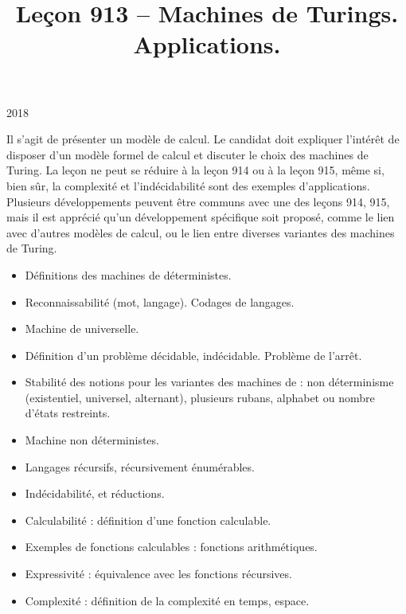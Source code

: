\documentclass{agregfiche}
\title{Leçon 913 -- Machines de Turings. Applications.}
\begin{document}
\maketitle

\secrapports

\begin{rapport}{2018}

Il s'agit de présenter un modèle de calcul.
Le candidat doit expliquer l'intérêt de disposer d'un modèle formel de calcul et discuter le choix des machines de Turing.
La leçon ne peut se réduire à la leçon 914 ou à la leçon 915, même si, bien sûr, la complexité et l'indécidabilité sont des exemples d'applications.
Plusieurs développements peuvent être communs avec une des leçons 914, 915, mais il est apprécié qu'un développement spécifique soit proposé, comme le lien avec d'autres modèles de calcul, ou le lien entre diverses variantes des machines de Turing.

\end{rapport}

\secindispensables

\begin{itemize}
    \item Définitions des machines de  déterministes.
    \item Reconnaissabilité (mot, langage). Codages de langages. %
    \item Machine de  universelle.
    \item Définition d'un problème décidable, indécidable. Problème de l'arrêt.
\end{itemize}


\secasavoir


\begin{itemize}
  	\item Stabilité des notions pour les variantes des machines de  : non
    déterminisme (existentiel, universel, alternant), 
    plusieurs rubans, alphabet ou nombre d'états restreints. %
    \item Machine non déterministes.
	\item Langages récursifs, récursivement énumérables.
	\item Indécidabilité,   et réductions.
	\item Calculabilité : définition d'une fonction calculable.
	\item Exemples de fonctions calculables : fonctions arithmétiques.
	\item Expressivité : équivalence avec les fonctions récursives.
	\item Complexité : définition de la complexité en temps, espace.
\end{itemize}
\end{document}
